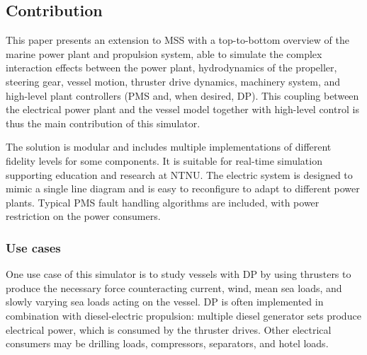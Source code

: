 \documentclass[twocolumn,10pt]{asme2e}
\begin{document}
\subsection*{Contribution}
This paper presents an extension to MSS with a top-to-bottom overview of the marine power plant and propulsion system, able to simulate the complex interaction effects between the power plant, hydrodynamics of the propeller, steering gear, vessel motion, thruster drive dynamics, machinery system, and high-level plant controllers (PMS and, when desired, DP). This coupling between the electrical power plant and the vessel model together with high-level control is thus the main contribution of this simulator.

The solution is modular and includes multiple implementations of different fidelity levels for some components. It is suitable for real-time simulation supporting education and research at NTNU. The electric system is designed to mimic a single line diagram and is easy to reconfigure to adapt to different power plants. Typical PMS fault handling algorithms are included, with power restriction on the power consumers.


\subsubsection*{Use cases}
One use case of this simulator is to study vessels with DP by using thrusters to produce the necessary force counteracting current, wind, mean sea loads, and slowly varying sea loads acting on the vessel.
DP is often implemented in combination with diesel-electric propulsion: multiple diesel generator sets produce electrical power, which is consumed by the thruster drives.
Other electrical consumers may be drilling loads, compressors, separators, and hotel loads.
\end{document}
